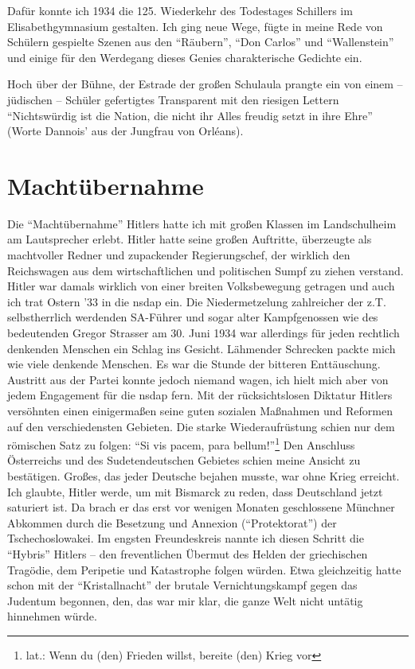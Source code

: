 \documentclass[a5paper,pagesize,10pt,twoside=true]{scrbook}
\begin{document}
Dafür konnte ich 1934 die 125. Wiederkehr des Todestages Schillers im Elisabethgymnasium gestalten. Ich ging neue Wege, fügte in meine Rede von Schülern gespielte Szenen aus den \enquote{Räubern}, \enquote{Don Carlos} und \enquote{Wallenstein} und einige für den Werdegang dieses Genies charakterische Gedichte ein.

Hoch über der Bühne, der Estrade der großen Schulaula prangte ein von einem -- jüdischen -- Schüler gefertigtes Transparent mit den riesigen Lettern \enquote{Nichtswürdig ist die Nation, die nicht ihr Alles freudig setzt in ihre Ehre} (Worte Dannois' aus der Jungfrau von Orléans).

\section{Machtübernahme}

Die \enquote{Machtübernahme} Hitlers hatte ich mit großen Klassen im Landschulheim am Lautsprecher erlebt. Hitler hatte seine großen Auftritte, überzeugte als machtvoller Redner und zupackender Regierungschef, der wirklich den Reichswagen aus dem wirtschaftlichen und politischen Sumpf zu ziehen verstand. Hitler war damals wirklich von einer breiten Volksbewegung getragen und auch ich trat Ostern '33 in die \ac{nsdap} ein. Die Niedermetzelung zahlreicher der z.T. selbstherrlich werdenden SA-Führer und sogar alter Kampfgenossen wie des bedeutenden Gregor Strasser am 30. Juni 1934 war allerdings für jeden rechtlich denkenden Menschen ein Schlag ins Gesicht. Lähmender Schrecken packte mich wie viele denkende Menschen. Es war die Stunde der bitteren Enttäuschung. Austritt aus der Partei konnte jedoch niemand wagen, ich hielt mich aber von jedem Engagement für die \ac{nsdap} fern. Mit der rücksichtslosen Diktatur Hitlers versöhnten einen einigermaßen seine guten sozialen Maßnahmen und Reformen auf den verschiedensten Gebieten. Die starke Wiederaufrüstung schien nur dem römischen Satz zu folgen: \enquote{Si vis pacem, para bellum!}\footnote{lat.: Wenn du (den) Frieden willst, bereite (den) Krieg vor} Den Anschluss Österreichs und des Sudetendeutschen Gebietes schien meine Ansicht zu bestätigen. Großes, das jeder Deutsche bejahen musste, war ohne Krieg erreicht. Ich glaubte, Hitler werde, um mit Bismarck zu reden, dass Deutschland jetzt saturiert ist. Da brach er das erst vor wenigen Monaten geschlossene Münchner Abkommen durch die Besetzung und Annexion (\enquote{Protektorat}) der Tschechoslowakei. Im engsten Freundeskreis nannte ich diesen Schritt die \enquote{Hybris} Hitlers -- den freventlichen Übermut des Helden der griechischen Tragödie, dem Peripetie und Katastrophe folgen würden. Etwa gleichzeitig hatte schon mit der \enquote{Kristallnacht} der brutale Vernichtungskampf gegen das Judentum begonnen, den, das war mir klar, die ganze Welt nicht untätig hinnehmen würde.
\end{document}
